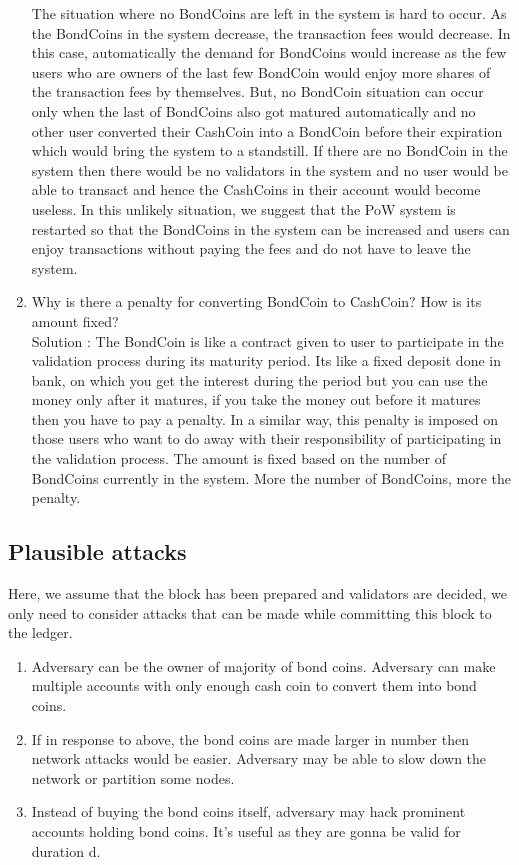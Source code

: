 \begin{enumerate}
    The situation where no BondCoins are left in the system is hard to occur. As the BondCoins in the system decrease, the transaction fees would decrease. In this case, automatically the demand for BondCoins would increase as the few users who are owners of the last few BondCoin would enjoy more shares of the transaction fees by themselves. But, no BondCoin situation can occur only when the last of BondCoins also got matured automatically and no other user converted their CashCoin into a BondCoin before their expiration which would bring the system to a standstill. If there are no BondCoin in the system then there would be no validators in the system and no user would be able to transact and hence the CashCoins in their account would become useless. In this unlikely situation, we suggest that the PoW system is restarted so that the BondCoins in the system can be increased and users can enjoy transactions without paying the fees and do not have to leave the system.
    \item Why is there a penalty for converting BondCoin to CashCoin? How is its amount fixed?\\
    Solution : The BondCoin is like a contract given to user to participate in the validation process during its maturity period. Its like a fixed deposit done in bank, on which you get the interest during the period but you can use the money only after it matures, if you take the money out before it matures then you have to pay a penalty. In a similar way, this penalty is imposed on those users who want to do away with their responsibility of participating in the validation process. The amount is fixed based on the number of BondCoins currently in the system. More the number of BondCoins, more the penalty.

\end{enumerate}

\subsection{Plausible attacks}

Here, we assume that the block has been prepared and validators are decided, we only need to consider attacks that can be made while committing this block to the ledger.

\begin{enumerate}
    \item Adversary can be the owner of majority of bond coins. Adversary can make multiple accounts with only enough cash coin to convert them into bond coins.
    \item If in response to above, the bond coins are made larger in number then network attacks would be easier. Adversary may be able to slow down the network or partition some nodes.
    \item Instead of buying the bond coins itself, adversary may hack prominent accounts holding bond coins. It's useful as they are gonna be valid for duration d.
\end{enumerate}